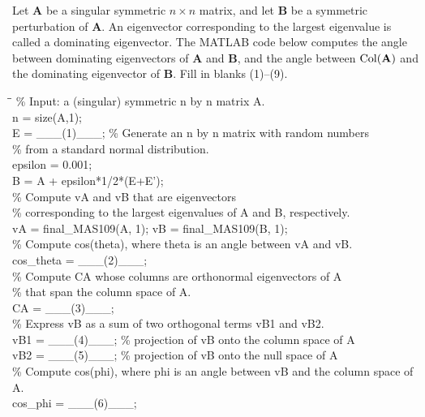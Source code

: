 \documentclass[11pt,oneside]{article}
\begin{document}
\begin{problem}
Let $\mathbf A$ be a singular symmetric $n\times n$ matrix, and let $\mathbf B$ be a symmetric perturbation of $\mathbf A$. An eigenvector corresponding to the largest eigenvalue is called a dominating eigenvector. The MATLAB code below computes the angle between dominating eigenvectors of $\mathbf A$ and $\mathbf B$, and the angle between $\operatorname{Col}(\mathbf A)$ and the dominating eigenvector of $\mathbf B$. Fill in blanks \textup{(1)}--\textup{(9)}.

{\small\ttfamily
\begin{tabbing}
\hspace{2em}\=\hspace{2em}\=\kill
\% Input: a (singular) symmetric n by n matrix A.\\
n = size(A,1);\\
E = \_\_\_(1)\_\_\_; \% Generate an n by n matrix with random numbers\\
\>\% from a standard normal distribution.\\
epsilon = 0.001;\\
B = A + epsilon*1/2*(E+E');\\[0.15em]
\% Compute vA and vB that are eigenvectors\\
\% corresponding to the largest eigenvalues of A and B, respectively.\\
vA = final\_MAS109(A, 1); vB = final\_MAS109(B, 1);\\[0.15em]
\% Compute cos(theta), where theta is an angle between vA and vB.\\
cos\_theta = \_\_\_(2)\_\_\_;\\[0.15em]
\% Compute CA whose columns are orthonormal eigenvectors of A\\
\% that span the column space of A.\\
CA = \_\_\_(3)\_\_\_;\\[0.15em]
\% Express vB as a sum of two orthogonal terms vB1 and vB2.\\
vB1 = \_\_\_(4)\_\_\_; \% projection of vB onto the column space of A\\
vB2 = \_\_\_(5)\_\_\_; \% projection of vB onto the null space of A\\[0.15em]
\% Compute cos(phi), where phi is an angle between vB and the column space of A.\\
cos\_phi = \_\_\_(6)\_\_\_;\\[0.35em]

\end{tabbing}}
\end{problem}
\end{document}
